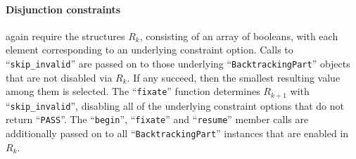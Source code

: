     \paragraph*{Disjunction constraints} again require the structures $R_k$,
    consisting of an array of booleans, with each element corresponding to an
    underlying constraint option.
    Calls to ``\texttt{skip\_invalid}'' are passed on to those underlying
    ``\texttt{BacktrackingPart}'' objects that are not disabled via $R_k$.
    If any succeed, then the smallest resulting value among them is selected.
    The ``{\tt fixate}'' function determines $R_{k+1}$ with
    ``\texttt{skip\_invalid}'', disabling all of the underlying constraint
    options that do not return ``{\tt PASS}''.
    The ``\texttt{begin}'', ``\texttt{fixate}'' and ``\texttt{resume}'' member
    calls are additionally passed on to all ``{\tt BacktrackingPart}'' instances
    that are enabled in $R_k$.

